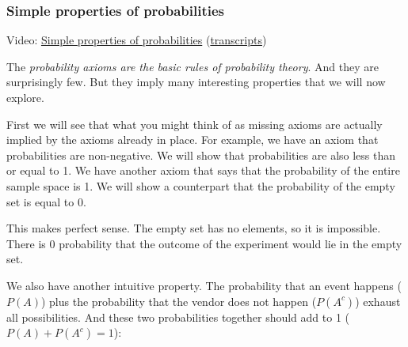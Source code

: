 \documentclass[pdftex, brazil, 12pt, twoside]{article}
\begin{document}
\subsubsection{Simple properties of probabilities}
\label{un1-lec1-simple-properties}

Video: \href{https://www.youtube.com/watch?v=VgYkGzp\_3jk}{Simple properties of
  probabilities}
(\href{Unit-1/01\_lecture\_1\_probability\_models\_and\_axioms/l01\_4\_transcripts.pdf}{transcripts})

The \emph{probability axioms are the basic rules
of probability theory}. And they are surprisingly few.
But they imply many interesting properties that we
will now explore.

First we will see that what you might think of as missing
axioms are actually implied by the axioms already in place.
For example, we have an axiom that probabilities are
non-negative. We will show that probabilities are also less
than or equal to 1.
We have another axiom that says that the probability of
the entire sample space is 1.
We will show a counterpart that the probability of the
empty set is equal to 0.

\begin{figure}[H]
  \begin{center}
  \end{center}
\end{figure}

This makes perfect sense.
The empty set has no elements, so it is impossible.
There is 0 probability that the outcome of the experiment
would lie in the empty set.

We also have another intuitive property.
The probability that an event happens ($P(A)$) plus the probability
that the vendor does not happen ($P(A^c)$) exhaust all
possibilities. And these two probabilities together should add to 1
($P(A) + P(A^c) = 1$):

\begin{figure}[H]
  \begin{center}
  \end{center}
\end{figure}
\end{document}
